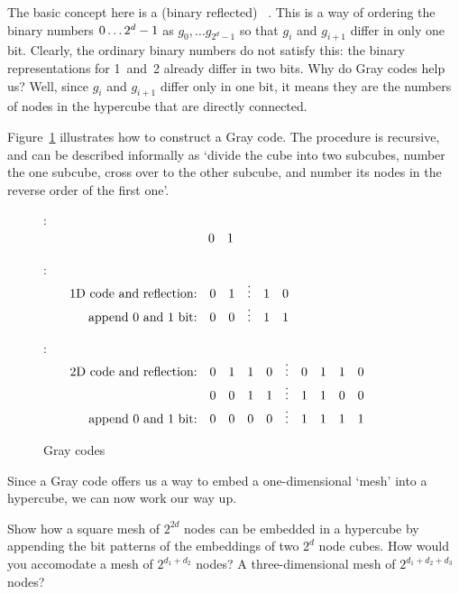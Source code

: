 The basic concept here is a (binary reflected) ~\cite{Gray:graycodepatent}. This is a way of ordering the
binary numbers $0\ldots2^d-\nobreak1$ as $g_0,\ldots g_{2^d-1}$ so that $g_i$
and $g_{i+1}$ differ in only one bit. Clearly, the ordinary binary
numbers do not satisfy this: the binary representations for 1~and~2
already differ in two bits. Why do Gray codes help us? Well, since
$g_i$ and $g_{i+1}$ differ only in one bit, it means they are the
numbers of nodes in the hypercube that are directly connected.

Figure~\ref{fig:graycode} illustrates how to construct a Gray
code. The procedure is recursive, and can be described informally as
`divide the cube into two subcubes, number the one subcube, cross over
to the other subcube, and number its nodes in the reverse order of the
first one'.

\begin{figure}[h]
\hbox{:
$\vcenter{$
\begin{array}{rll}
  \hphantom{1D code and reflection:}&0&1\\
\end{array}$}
$}

\hbox{:
$\vcenter{$
\begin{array}{rccccc}
  \hbox{1D code and reflection:}&0&1&\vdots&1&0\\
  \hbox{append 0 and 1 bit:}&0&0&\vdots&1&1
\end{array}$}
$}

\hbox{:
$\vcenter{$
\begin{array}{rccccccccc}
  \hbox{2D code and reflection:}&0&1&1&0&\vdots&0&1&1&0\\
  &0&0&1&1&\vdots&1&1&0&0\\
  \hbox{append 0 and 1 bit:}&0&0&0&0&\vdots&1&1&1&1
\end{array}$}
$}

  \caption{Gray codes}
  \label{fig:graycode}
\end{figure}

Since a Gray code offers us a way to embed a one-dimensional `mesh'
into a hypercube, we can now work our way up.
\begin{exercise}
  Show how a square mesh of $2^{2d}$ nodes can be embedded in a
  hypercube by appending the bit patterns of the embeddings of two
  $2^d$ node cubes. How would you accomodate a mesh of $2^{d_1+d_2}$
  nodes? A three-dimensional mesh of $2^{d_1+d_2+d_3}$ nodes?
\end{exercise}

